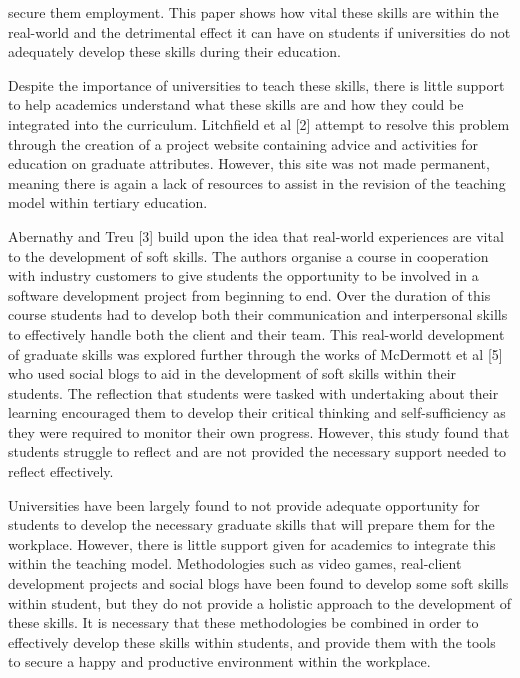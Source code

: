 \documentclass{l4proj}
\begin{document}
secure them employment. This paper shows how vital these skills are within the real-world and the 
detrimental effect it can have on students if universities do not adequately develop these skills 
during their education.
\par 
Despite the importance of universities to teach these skills, there is little support to 
help academics understand what these skills are and how they could be integrated into the curriculum.
 Litchfield et al [2] attempt to resolve this problem through the creation of a project website 
 containing advice and activities for education on graduate attributes. However, this site was not 
 made permanent, meaning there is again a lack of resources to assist in the revision of the 
 teaching model within tertiary education.
 \par 
Abernathy and Treu [3] build upon the idea that real-world experiences are vital to the 
development of soft skills. The authors organise a course in cooperation with industry customers 
to give students the opportunity to be involved in a software development project from beginning 
to end. Over the duration of this course students had to develop both their communication and 
interpersonal skills to effectively handle both the client and their team. This real-world 
development of graduate skills was explored further through the works of McDermott et al [5] who 
used social blogs to aid in the development of soft skills within their students. The reflection 
that students were tasked with undertaking about their learning encouraged them to develop their 
critical thinking and self-sufficiency as they were required to monitor their own progress. 
However, this study found that students struggle to reflect and are not provided the necessary 
support needed to reflect effectively. 
\par 
Universities have been largely found to not provide adequate opportunity for students to 
develop the necessary graduate skills that will prepare them for the workplace. However, there is 
little support given for academics to integrate this within the teaching model. Methodologies such 
as video games, real-client development projects and social blogs have been found to develop some 
soft skills within student, but they do not provide a holistic approach to the development of 
these skills. It is necessary that these methodologies be combined in order to effectively 
develop these skills within students, and provide them with the tools to secure a happy and 
productive environment within the workplace.
\end{document}

